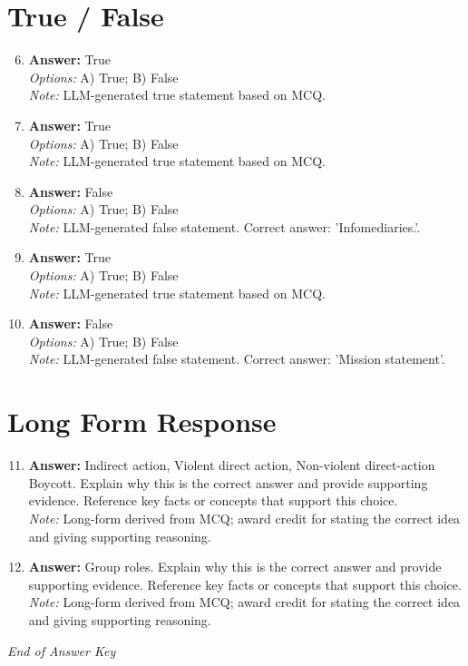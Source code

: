 \documentclass[12pt]{article}
\begin{document}
\section*{True / False}
\begin{enumerate}[label=\arabic*.]
\setcounter{enumi}{5}
\item \textbf{Answer:} True
\\ \textit{Options:} A) True; B) False
\\ \textit{Note:} LLM-generated true statement based on MCQ.
\item \textbf{Answer:} True
\\ \textit{Options:} A) True; B) False
\\ \textit{Note:} LLM-generated true statement based on MCQ.
\item \textbf{Answer:} False
\\ \textit{Options:} A) True; B) False
\\ \textit{Note:} LLM-generated false statement. Correct answer: 'Infomediaries.'.
\item \textbf{Answer:} True
\\ \textit{Options:} A) True; B) False
\\ \textit{Note:} LLM-generated true statement based on MCQ.
\item \textbf{Answer:} False
\\ \textit{Options:} A) True; B) False
\\ \textit{Note:} LLM-generated false statement. Correct answer: 'Mission statement'.
\end{enumerate}

\section*{Long Form Response}
\begin{enumerate}[label=\arabic*.]
\setcounter{enumi}{10}
\item \textbf{Answer:} Indirect action, Violent direct action, Non-violent direct-action Boycott. Explain why this is the correct answer and provide supporting evidence. Reference key facts or concepts that support this choice.
\\ \textit{Note:} Long-form derived from MCQ; award credit for stating the correct idea and giving supporting reasoning.
\item \textbf{Answer:} Group roles. Explain why this is the correct answer and provide supporting evidence. Reference key facts or concepts that support this choice.
\\ \textit{Note:} Long-form derived from MCQ; award credit for stating the correct idea and giving supporting reasoning.
\end{enumerate}

\vfill
\noindent\textit{End of Answer Key}
\end{document}
